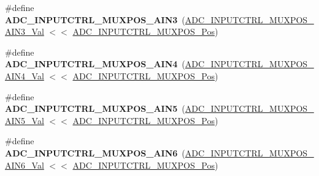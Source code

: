 \begin{DoxyCompactItemize}
\item 
\hypertarget{group___s_a_m_l21___a_d_c_gad0d839b189dac6b24cf6b79440745b82}{}\#define {\bfseries A\+D\+C\+\_\+\+I\+N\+P\+U\+T\+C\+T\+R\+L\+\_\+\+M\+U\+X\+P\+O\+S\+\_\+\+A\+I\+N3}~(\hyperlink{group___s_a_m_l21___a_d_c_ga251c9c1e052523310d09b1acc78e78ac}{A\+D\+C\+\_\+\+I\+N\+P\+U\+T\+C\+T\+R\+L\+\_\+\+M\+U\+X\+P\+O\+S\+\_\+\+A\+I\+N3\+\_\+\+Val} $<$$<$ \hyperlink{group___s_a_m_l21___a_d_c_ga583868be285e1c06c9a93dfd552d8c6a}{A\+D\+C\+\_\+\+I\+N\+P\+U\+T\+C\+T\+R\+L\+\_\+\+M\+U\+X\+P\+O\+S\+\_\+\+Pos})\label{group___s_a_m_l21___a_d_c_gad0d839b189dac6b24cf6b79440745b82}

\item 
\hypertarget{group___s_a_m_l21___a_d_c_ga95b23a31b71020e11e47207ee6a1af1f}{}\#define {\bfseries A\+D\+C\+\_\+\+I\+N\+P\+U\+T\+C\+T\+R\+L\+\_\+\+M\+U\+X\+P\+O\+S\+\_\+\+A\+I\+N4}~(\hyperlink{group___s_a_m_l21___a_d_c_ga7f3a2f08ed3b07f84a8c33674b878797}{A\+D\+C\+\_\+\+I\+N\+P\+U\+T\+C\+T\+R\+L\+\_\+\+M\+U\+X\+P\+O\+S\+\_\+\+A\+I\+N4\+\_\+\+Val} $<$$<$ \hyperlink{group___s_a_m_l21___a_d_c_ga583868be285e1c06c9a93dfd552d8c6a}{A\+D\+C\+\_\+\+I\+N\+P\+U\+T\+C\+T\+R\+L\+\_\+\+M\+U\+X\+P\+O\+S\+\_\+\+Pos})\label{group___s_a_m_l21___a_d_c_ga95b23a31b71020e11e47207ee6a1af1f}

\item 
\hypertarget{group___s_a_m_l21___a_d_c_gae6319cb6464acfaf08d557318b25b3d3}{}\#define {\bfseries A\+D\+C\+\_\+\+I\+N\+P\+U\+T\+C\+T\+R\+L\+\_\+\+M\+U\+X\+P\+O\+S\+\_\+\+A\+I\+N5}~(\hyperlink{group___s_a_m_l21___a_d_c_ga5114a1b1855bcb59f3f85d84bc010f6a}{A\+D\+C\+\_\+\+I\+N\+P\+U\+T\+C\+T\+R\+L\+\_\+\+M\+U\+X\+P\+O\+S\+\_\+\+A\+I\+N5\+\_\+\+Val} $<$$<$ \hyperlink{group___s_a_m_l21___a_d_c_ga583868be285e1c06c9a93dfd552d8c6a}{A\+D\+C\+\_\+\+I\+N\+P\+U\+T\+C\+T\+R\+L\+\_\+\+M\+U\+X\+P\+O\+S\+\_\+\+Pos})\label{group___s_a_m_l21___a_d_c_gae6319cb6464acfaf08d557318b25b3d3}

\item 
\hypertarget{group___s_a_m_l21___a_d_c_ga3a926929b642b8c084d4647aabcbb8fb}{}\#define {\bfseries A\+D\+C\+\_\+\+I\+N\+P\+U\+T\+C\+T\+R\+L\+\_\+\+M\+U\+X\+P\+O\+S\+\_\+\+A\+I\+N6}~(\hyperlink{group___s_a_m_l21___a_d_c_ga1665dbaf7d7c4b25c646195814e52827}{A\+D\+C\+\_\+\+I\+N\+P\+U\+T\+C\+T\+R\+L\+\_\+\+M\+U\+X\+P\+O\+S\+\_\+\+A\+I\+N6\+\_\+\+Val} $<$$<$ \hyperlink{group___s_a_m_l21___a_d_c_ga583868be285e1c06c9a93dfd552d8c6a}{A\+D\+C\+\_\+\+I\+N\+P\+U\+T\+C\+T\+R\+L\+\_\+\+M\+U\+X\+P\+O\+S\+\_\+\+Pos})\label{group___s_a_m_l21___a_d_c_ga3a926929b642b8c084d4647aabcbb8fb}


\end{DoxyCompactItemize}
